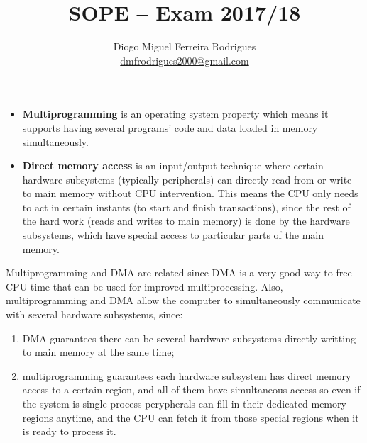 \documentclass{sope}
\title{SOPE -- Exam 2017/18}
\author{Diogo Miguel Ferreira Rodrigues \\ \href{mailto:dmfrodrigues2000@gmail.com}{dmfrodrigues2000@gmail.com}}
\begin{document}
\setcounter{chapter}{17}
\begin{itemize}
    \item \textbf{Multiprogramming} is an operating system property which means it supports having several programs' code and data loaded in memory simultaneously.
    \item \textbf{Direct memory access} is an input/output technique where certain hardware subsystems (typically peripherals) can directly read from or write to main memory without CPU intervention. This means the CPU only needs to act in certain instants (to start and finish transactions), since the rest of the hard work (reads and writes to main memory) is done by the hardware subsystems, which have special access to particular parts of the main memory.
\end{itemize}
Multiprogramming and DMA are related since DMA is a very good way to free CPU time that can be used for improved multiprocessing. Also, multiprogramming and DMA allow the computer to simultaneously communicate with several hardware subsystems, since:
\begin{enumerate}
    \item DMA guarantees there can be several hardware subsystems directly writting to main memory at the same time;
    \item multiprogramming guarantees each hardware subsystem has direct memory access to a certain region, and all of them have simultaneous access so even if the system is single-process perypherals can fill in their dedicated memory regions anytime, and the CPU can fetch it from those special regions when it is ready to process it.
\end{enumerate}
\end{document}
